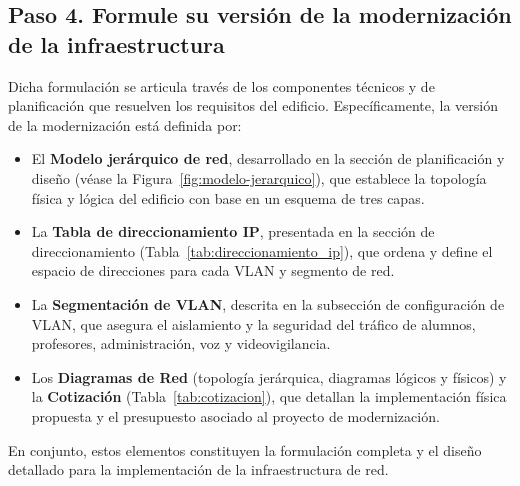 \subsection*{Paso 4. Formule su versión de la modernización de la infraestructura}

Dicha formulación se articula través de los componentes técnicos y de planificación que resuelven los requisitos del edificio. Específicamente, la versión de la modernización está definida por:

\begin{itemize}
\item El \textbf{Modelo jerárquico de red}, desarrollado en la sección de planificación y diseño (véase la Figura~\ref{fig:modelo-jerarquico}), que establece la topología física y lógica del edificio con base en un esquema de tres capas.
\item La \textbf{Tabla de direccionamiento IP}, presentada en la sección de direccionamiento (Tabla~\ref{tab:direccionamiento_ip}), que ordena y define el espacio de direcciones para cada VLAN y segmento de red.
\item La \textbf{Segmentación de VLAN}, descrita en la subsección de configuración de VLAN, que asegura el aislamiento y la seguridad del tráfico de alumnos, profesores, administración, voz y videovigilancia.
\item Los \textbf{Diagramas de Red} (topología jerárquica, diagramas lógicos y físicos) y la \textbf{Cotización} (Tabla~\ref{tab:cotizacion}), que detallan la implementación física propuesta y el presupuesto asociado al proyecto de modernización.
\end{itemize}

En conjunto, estos elementos constituyen la formulación completa y el diseño detallado para la implementación de la infraestructura de red.